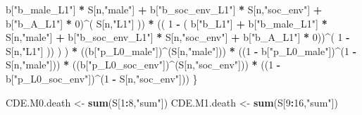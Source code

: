 \documentclass[
]{book}
\newenvironment{Shaded}{\begin{snugshade}}{\end{snugshade}}
\newcommand{\DecValTok}[1]{\textcolor[rgb]{0.00,0.00,0.81}{#1}}
\newcommand{\FunctionTok}[1]{\textcolor[rgb]{0.13,0.29,0.53}{\textbf{#1}}}
\newcommand{\NormalTok}[1]{#1}
\newcommand{\OtherTok}[1]{\textcolor[rgb]{0.56,0.35,0.01}{#1}}
\newcommand{\SpecialCharTok}[1]{\textcolor[rgb]{0.81,0.36,0.00}{\textbf{#1}}}
\newcommand{\StringTok}[1]{\textcolor[rgb]{0.31,0.60,0.02}{#1}}
\begin{document}
\begin{Shaded}
\begin{Highlighting}[]
\NormalTok{                           b[}\StringTok{"b\_male\_L1"}\NormalTok{] }\SpecialCharTok{*}\NormalTok{ S[n,}\StringTok{"male"}\NormalTok{] }\SpecialCharTok{+}  
\NormalTok{                           b[}\StringTok{"b\_soc\_env\_L1"}\NormalTok{] }\SpecialCharTok{*}\NormalTok{ S[n,}\StringTok{"soc\_env"}\NormalTok{] }\SpecialCharTok{+}
\NormalTok{                           b[}\StringTok{"b\_A\_L1"}\NormalTok{] }\SpecialCharTok{*} \DecValTok{0}\NormalTok{)}\SpecialCharTok{\^{}}\NormalTok{( S[n,}\StringTok{"L1"}\NormalTok{] )) }\SpecialCharTok{*}
\NormalTok{                      (( }\DecValTok{1} \SpecialCharTok{{-}}\NormalTok{ ( b[}\StringTok{"b\_L1"}\NormalTok{] }\SpecialCharTok{+}
\NormalTok{                                 b[}\StringTok{"b\_male\_L1"}\NormalTok{] }\SpecialCharTok{*}\NormalTok{ S[n,}\StringTok{"male"}\NormalTok{] }\SpecialCharTok{+}  
\NormalTok{                                 b[}\StringTok{"b\_soc\_env\_L1"}\NormalTok{] }\SpecialCharTok{*}\NormalTok{ S[n,}\StringTok{"soc\_env"}\NormalTok{] }\SpecialCharTok{+}
\NormalTok{                                 b[}\StringTok{"b\_A\_L1"}\NormalTok{] }\SpecialCharTok{*} \DecValTok{0}\NormalTok{))}\SpecialCharTok{\^{}}\NormalTok{( }\DecValTok{1} \SpecialCharTok{{-}}\NormalTok{ S[n,}\StringTok{"L1"}\NormalTok{] )) ) ) }\SpecialCharTok{*}
\NormalTok{      ((b[}\StringTok{"p\_L0\_male"}\NormalTok{])}\SpecialCharTok{\^{}}\NormalTok{(S[n,}\StringTok{"male"}\NormalTok{])) }\SpecialCharTok{*} 
\NormalTok{      ((}\DecValTok{1} \SpecialCharTok{{-}}\NormalTok{ b[}\StringTok{"p\_L0\_male"}\NormalTok{])}\SpecialCharTok{\^{}}\NormalTok{(}\DecValTok{1} \SpecialCharTok{{-}}\NormalTok{ S[n,}\StringTok{"male"}\NormalTok{])) }\SpecialCharTok{*} 
\NormalTok{      ((b[}\StringTok{"p\_L0\_soc\_env"}\NormalTok{])}\SpecialCharTok{\^{}}\NormalTok{(S[n,}\StringTok{"soc\_env"}\NormalTok{])) }\SpecialCharTok{*}
\NormalTok{      ((}\DecValTok{1} \SpecialCharTok{{-}}\NormalTok{ b[}\StringTok{"p\_L0\_soc\_env"}\NormalTok{])}\SpecialCharTok{\^{}}\NormalTok{(}\DecValTok{1} \SpecialCharTok{{-}}\NormalTok{ S[n,}\StringTok{"soc\_env"}\NormalTok{])) }
\NormalTok{    \}}
  
\NormalTok{  CDE.M0.death }\OtherTok{\textless{}{-}} \FunctionTok{sum}\NormalTok{(S[}\DecValTok{1}\SpecialCharTok{:}\DecValTok{8}\NormalTok{,}\StringTok{"sum"}\NormalTok{])}
\NormalTok{  CDE.M1.death }\OtherTok{\textless{}{-}} \FunctionTok{sum}\NormalTok{(S[}\DecValTok{9}\SpecialCharTok{:}\DecValTok{16}\NormalTok{,}\StringTok{"sum"}\NormalTok{])}
  

\end{Highlighting}
\end{Shaded}
\end{document}
